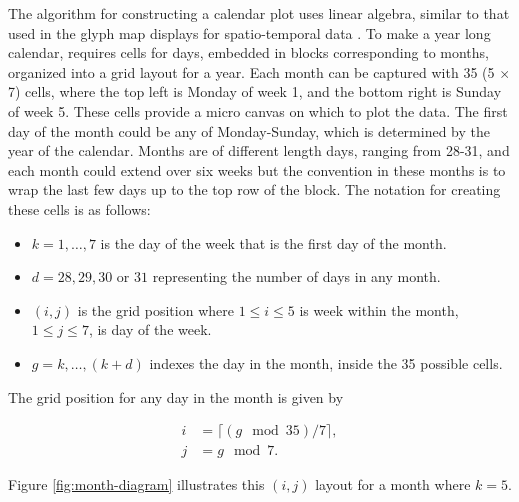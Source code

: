 \documentclass[article]{jss}
\providecommand{\tightlist}{%
  \setlength{\itemsep}{0pt}\setlength{\parskip}{0pt}}
\theoremstyle{definition}
\theoremstyle{definition}
\theoremstyle{remark}
\begin{document}
The algorithm for constructing a calendar plot uses linear algebra,
similar to that used in the glyph map displays for spatio-temporal data
\citep{Wickham2012glyph}. To make a year long calendar, requires cells
for days, embedded in blocks corresponding to months, organized into a
grid layout for a year. Each month can be captured with 35 (5 \(\times\)
7) cells, where the top left is Monday of week 1, and the bottom right
is Sunday of week 5. These cells provide a micro canvas on which to plot
the data. The first day of the month could be any of Monday-Sunday,
which is determined by the year of the calendar. Months are of different
length days, ranging from 28-31, and each month could extend over six
weeks but the convention in these months is to wrap the last few days up
to the top row of the block. The notation for creating these cells is as
follows:

\begin{itemize}
\tightlist
\item
  \(k = 1, \dots , 7\) is the day of the week that is the first day of
  the month.
\item
  \(d = 28, 29, 30\) or \(31\) representing the number of days in any
  month.
\item
  \((i, j)\) is the grid position where \(1 \le i \le 5\) is week within
  the month, \(1 \le j \le 7\), is day of the week.
\item
  \(g = k, \dots,(k+d)\) indexes the day in the month, inside the 35
  possible cells.
\end{itemize}

The grid position for any day in the month is given by

\begin{equation}
  \begin{aligned}
  i &= \lceil (g \mod 35) / 7\rceil, \\
  j &= g \mod 7. \label{eq:grid}
  \end{aligned}
\end{equation}

Figure \ref{fig:month-diagram} illustrates this \((i,j)\) layout for a
month where \(k=5\).
\end{document}
